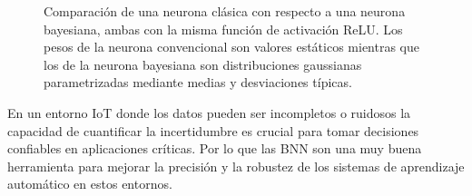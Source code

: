 \begin{figure}[htb]
  \begin{subcaptiongroup}
  \begin{floatrow}
  \end{floatrow}
  \end{subcaptiongroup}
  \caption{Comparación de una neurona clásica con respecto a una neurona bayesiana, ambas con la misma función de activación ReLU. Los pesos de la neurona convencional son valores estáticos mientras que los de la neurona bayesiana son distribuciones gaussianas parametrizadas mediante medias y desviaciones típicas.}%
  \label{fig:neuron_comparation}%
\end{figure}

En un entorno IoT donde los datos pueden ser incompletos o ruidosos la capacidad de cuantificar la incertidumbre es crucial para tomar decisiones confiables en aplicaciones críticas. Por lo que las BNN son una muy buena herramienta para mejorar la precisión y la robustez de los sistemas de aprendizaje automático en estos entornos.

